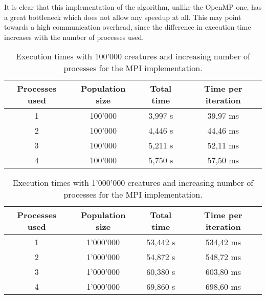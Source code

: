 \documentclass[12pt,a4paper,oneside]{article}
\begin{document}
	It is clear that this implementation of the algorithm, unlike the OpenMP one, has a great bottleneck which does not allow any speedup at all.
	This may point towards a high communication overhead, since the difference in execution time increases with the number of processes used.

	\begin{table}[!ht]
		\centering
		\begin{tabular}{|c|c|c|c|}
		\hline
		Processes used & Population size & Total time & Time per iteration \\ \hline
		1                   & 100'000             & 3,997 s            & 39,97 ms                    \\ \hline
		2                   & 100'000             & 4,446 s            & 44,46 ms                    \\ \hline
		3                   & 100'000             & 5,211 s            & 52,11 ms                    \\ \hline
		4                   & 100'000             & 5,750 s            & 57,50 ms                    \\ \hline
		\end{tabular}
		\caption{Execution times with 100'000 creatures and increasing number of processes for the MPI implementation.}
		\label{table:mpi_100k}
	\end{table}

	\begin{table}[!ht]
		\centering
		\begin{tabular}{|c|c|c|c|}
		\hline
		Processes used & Population size & Total time & Time per iteration \\ \hline
		1                   & 1'000'000           & 53,442 s           & 534,42 ms                   \\ \hline
		2                   & 1'000'000           & 54,872 s           & 548,72 ms                   \\ \hline
		3                   & 1'000'000           & 60,380 s           & 603,80 ms                   \\ \hline
		4                   & 1'000'000           & 69,860 s           & 698,60 ms                   \\ \hline
		\end{tabular}
		\caption{Execution times with 1'000'000 creatures and increasing number of processes for the MPI implementation.}
		\label{table:mpi_1m}
	\end{table}
\end{document}
